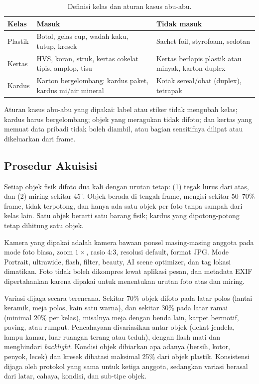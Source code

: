 \documentclass[10pt,twocolumn,a4paper]{article}
\begin{document}
\begin{table}[H]
\centering
\caption{Definisi kelas dan aturan kasus abu-abu.}
\label{tab:kelas}
\small
\begin{tabularx}{\columnwidth}{lXX}
\toprule
Kelas & Masuk & Tidak masuk\\
\midrule
Plastik & Botol, gelas cup, wadah kaku, tutup, kresek & Sachet foil, styrofoam, sedotan\\
Kertas & HVS, koran, struk, kertas cokelat tipis, amplop, tisu & Kertas berlapis plastik atau minyak, karton duplex\\
Kardus & Karton bergelombang: kardus paket, kardus mi/air mineral & Kotak sereal/obat (duplex), tetrapak\\
\bottomrule
\end{tabularx}
\end{table}

Aturan kasus abu-abu yang dipakai: label atau stiker tidak mengubah kelas; kardus harus bergelombang; objek yang meragukan tidak difoto; dan kertas yang memuat data pribadi tidak boleh diambil, atau bagian sensitifnya dilipat atau dikeluarkan dari frame.

\subsection{Prosedur Akuisisi}
Setiap objek fisik difoto dua kali dengan urutan tetap: (1) tegak lurus dari atas, dan (2) miring sekitar $45^{\circ}$. Objek berada di tengah frame, mengisi sekitar 50--70\% frame, tidak terpotong, dan hanya ada satu objek per foto tanpa sampah dari kelas lain. Satu objek berarti satu barang fisik; kardus yang dipotong-potong tetap dihitung satu objek.

Kamera yang dipakai adalah kamera bawaan ponsel masing-masing anggota pada mode foto biasa, zoom $1\times$, rasio 4:3, resolusi default, format JPG. Mode Portrait, ultrawide, flash, filter, beauty, AI scene optimizer, dan tag lokasi dimatikan. Foto tidak boleh dikompres lewat aplikasi pesan, dan metadata EXIF dipertahankan karena dipakai untuk menentukan urutan foto atas dan miring.

Variasi dijaga secara terencana. Sekitar 70\% objek difoto pada latar polos (lantai keramik, meja polos, kain satu warna), dan sekitar 30\% pada latar ramai (minimal 20\% per kelas), misalnya meja dengan benda lain, karpet bermotif, paving, atau rumput. Pencahayaan divariasikan antar objek (dekat jendela, lampu kamar, luar ruangan terang atau teduh), dengan flash mati dan menghindari \textit{backlight}. Kondisi objek dibiarkan apa adanya (bersih, kotor, penyok, lecek) dan kresek dibatasi maksimal 25\% dari objek plastik. Konsistensi dijaga oleh protokol yang sama untuk ketiga anggota, sedangkan variasi berasal dari latar, cahaya, kondisi, dan sub-tipe objek.
\end{document}
